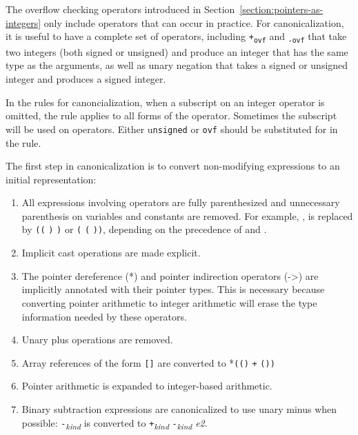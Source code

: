 The overflow checking operators introduced in
Section~\ref{section:pointers-as-integers} only include
operators that can occur in practice. For canonicalization, it is useful
to have a complete set of operators, including
\texttt{+\textsubscript{ovf}} and \texttt{\textsubscript{-ovf}} that
take two integers (both signed or unsigned) and produce an integer that
has the same type as the arguments, as well as unary negation that takes
a signed or unsigned integer and produces a signed integer.

In the rules for canoncialization, when a subscript on an integer
operator is omitted, the rule applies to all forms of the operator.
Sometimes the subscript  will be used on operators. Either
u\texttt{nsigned} or \texttt{ovf} should be substituted for 
in the rule.

The first step in canonicalization is to convert non-modifying
expressions to an initial representation:

\begin{enumerate}
\item
  All expressions involving operators are fully parenthesized and
  unnecessary parenthesis on variables and constants are removed. For
  example,     , is
  replaced by \texttt{((}  \texttt{)}
   \texttt{)} or \texttt{(} 
  \texttt{(}  \texttt{))}, depending on the
  precedence of  and .
\item
  Implicit cast operations are made explicit.
\item
  The pointer dereference (*) and pointer indirection operators
  (-\textgreater{}) are implicitly annotated with their pointer types.
  This is necessary because converting pointer arithmetic to integer
  arithmetic will erase the type information needed by these operators.
\item
  Unary plus operations are removed.
\item
  Array references of the form
  \texttt{[}\texttt{]} are converted to
  *\texttt{((}\texttt{)} \texttt{+}
  \texttt{(}\texttt{))}
\item
  Pointer arithmetic is expanded to integer-based arithmetic.
\item
  Binary subtraction expressions are canonicalized to use unary minus
  when possible:  \texttt{-}\emph{\textsubscript{kind}}
   is converted to 
  \texttt{+}\emph{\textsubscript{kind}}
  \texttt{-}\emph{\textsubscript{kind} e2}.
\end{enumerate}

